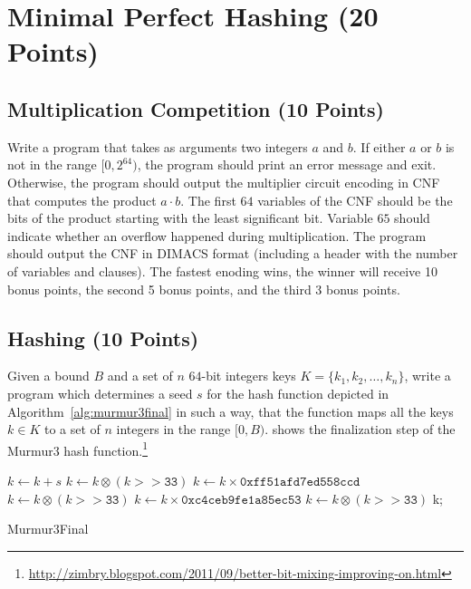 \documentclass{article}
\begin{document}
\vspace*{-1em}

\section{Minimal Perfect Hashing (20 Points)}

\subsection{Multiplication Competition (10 Points)}

Write a program that takes as arguments two integers $a$ and $b$.
If either $a$ or $b$ is not in the range $[0, 2^{64})$, the program should print an error message and exit.
Otherwise, the program should output the multiplier circuit encoding in CNF that computes the product $a \cdot b$.
The first $64$ variables of the CNF should be the bits of the product starting with the least significant bit.
Variable $65$ should indicate whether an overflow happened during multiplication.
The program should output the CNF in DIMACS format (including a header with the number of variables and clauses).
The fastest enoding wins, the winner will receive 10 bonus points, the second 5 bonus points, and the third 3 bonus points.

\subsection{Hashing (10 Points)}

\noindent\begin{minipage}{\textwidth}
\begin{minipage}[t]{.45\textwidth}
    Given a bound $B$ and a set of $n$ $64$-bit integers keys $K = \{k_1, k_2, \ldots, k_n\}$, write a program which determines a seed $s$ for the hash function depicted in Algorithm~\ref{alg:murmur3final} in such a way, that the function maps all the keys $k \in K$ to a set of $n$ integers in the range $[0, B)$.
     shows the finalization step of the Murmur3 hash function.\footnote{\url{http://zimbry.blogspot.com/2011/09/better-bit-mixing-improving-on.html}}
\end{minipage}\hfill
\begin{minipage}[t]{.5\textwidth}
    \vspace*{-1em}
    \begin{algorithm}[H]
        \DontPrintSemicolon
        \BlankLine
        $k \leftarrow k + s$ \;
        $k \leftarrow k \otimes (k >> \mathtt{33})$ \;
        $k \leftarrow k \times \mathtt{0xff51afd7ed558ccd}$ \;
        $k \leftarrow k \otimes (k >> \mathtt{33})$ \;
        $k \leftarrow k \times \mathtt{0xc4ceb9fe1a85ec53}$ \;
        $k \leftarrow k \otimes  (k >> \mathtt{33})$ \;
        \BlankLine
        \Return k;
        \BlankLine
        \label{alg:murmur3final}
        \caption{Murmur3Final}
    \end{algorithm}
\end{minipage}%
\end{minipage}
\end{document}

